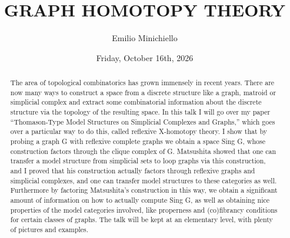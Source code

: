 \documentclass{UAmathtalk}
\author{ Emilio Minichiello }
\title{GRAPH HOMOTOPY THEORY}
\date{Friday, October 16th, 2026}
\begin{document}
\maketitle
\renewcommand*{\abstractsize}{\fontsize{13.5}{16.2}\selectfont}
\begin{abstract}
    {
The area of topological combinatorics has grown immensely in recent years. There are now many ways to construct a space from a discrete structure like a graph, matroid or simplicial complex and extract some combinatorial information about the discrete structure via the topology of the resulting space. In this talk I will go over my paper “Thomason-Type Model Structures on Simplicial Complexes and Graphs,” which goes over a particular way to do this, called reflexive X-homotopy theory. I show that by probing a graph G with reflexive complete graphs we obtain a space Sing G, whose construction factors through the clique complex of G. Matsushita showed that one can transfer a model structure from simplicial sets to loop graphs via this construction, and I proved that his construction actually factors through reflexive graphs and simplicial complexes, and one can transfer model structures to these categories as well. Furthermore by factoring Matsushita’s construction in this way, we obtain a significant amount of information on how to actually compute Sing G, as well as obtaining nice properties of the model categories involved, like properness and (co)fibrancy conditions for certain classes of graphs. The talk will be kept at an elementary level, with plenty of pictures and examples.
    }
\end{abstract}
\end{document}
